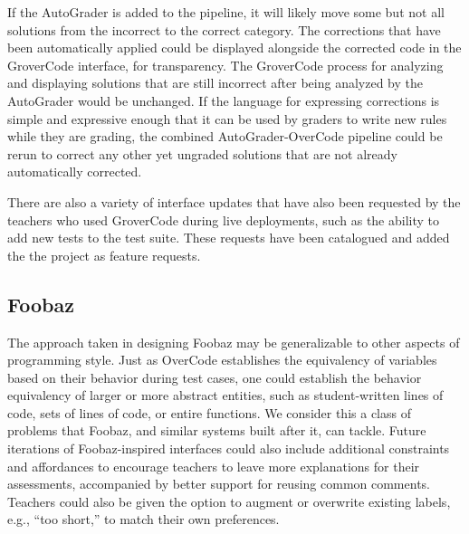 If the AutoGrader is added to the pipeline, it will likely move some but not all solutions from the incorrect to the correct category. The corrections that have been automatically applied could be displayed alongside the corrected code in the GroverCode interface, for transparency. The GroverCode process for analyzing and displaying solutions that are still incorrect after being analyzed by the AutoGrader would be unchanged. If the language for expressing corrections is simple and expressive enough that it can be used by graders to write new rules while they are grading, the combined AutoGrader-OverCode pipeline could be rerun to correct any other yet ungraded solutions that are not already automatically corrected. 

There are also a variety of interface updates that have also been requested by the teachers who used GroverCode during live deployments, such as the ability to add new tests to the test suite. These requests have been catalogued and added the the project as feature requests. 

\subsection{Foobaz}

The approach taken in designing Foobaz may be generalizable to other aspects of programming style. Just as OverCode establishes the equivalency of variables based on their behavior during test cases, one could establish the behavior equivalency of larger or more abstract entities, such as student-written lines of code, sets of lines of code, or entire functions. We consider this a class of problems that Foobaz, and similar systems built after it, can tackle. Future iterations of Foobaz-inspired interfaces could also include additional constraints and affordances to encourage teachers to leave more explanations for their assessments, accompanied by better support for reusing common comments. Teachers could also be given the option to augment or overwrite existing labels, e.g., ``too short,'' to match their own preferences. %

